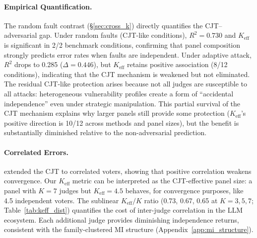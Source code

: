 \begin{table}[h]
\centering
\small
\caption{CJT/BFT vs.\ adversarial setting comparison. Under adversarial manipulation, the protective properties of independence and panel size are weakened or reversed.}
\label{tab:bft_comparison}
\end{table}

\paragraph{Empirical Quantification.} The random fault contrast (\S\ref{sec:cross_k}) directly quantifies the CJT--adversarial gap. Under random faults (CJT-like conditions), $R^2{=}0.730$ and $K_{\mathrm{eff}}$ is significant in 2/2 benchmark conditions, confirming that panel composition strongly predicts error rates when faults are independent. Under adaptive attack, $R^2$ drops to 0.285 ($\Delta{=}0.446$), but $K_{\mathrm{eff}}$ retains positive association (8/12 conditions), indicating that the CJT mechanism is weakened but not eliminated. The residual CJT-like protection arises because not all judges are susceptible to all attacks: heterogeneous vulnerability profiles create a form of ``accidental independence'' even under strategic manipulation. This partial survival of the CJT mechanism explains why larger panels still provide some protection ($K_{\mathrm{eff}}$'s positive direction is 10/12 across methods and panel sizes), but the benefit is substantially diminished relative to the non-adversarial prediction.

\paragraph{Correlated Errors.} \citet{ladha1992condorcet} extended the CJT to correlated voters, showing that positive correlation weakens convergence. Our $K_{\mathrm{eff}}$ metric can be interpreted as the CJT-effective panel size: a panel with $K{=}7$ judges but $K_{\mathrm{eff}}{=}4.5$ behaves, for convergence purposes, like 4.5 independent voters. The sublinear $K_{\mathrm{eff}}/K$ ratio (0.73, 0.67, 0.65 at $K{=}3,5,7$; Table~\ref{tab:keff_dist}) quantifies the cost of inter-judge correlation in the LLM ecosystem. Each additional judge provides diminishing independence returns, consistent with the family-clustered MI structure (Appendix~\ref{app:mi_structure}).

